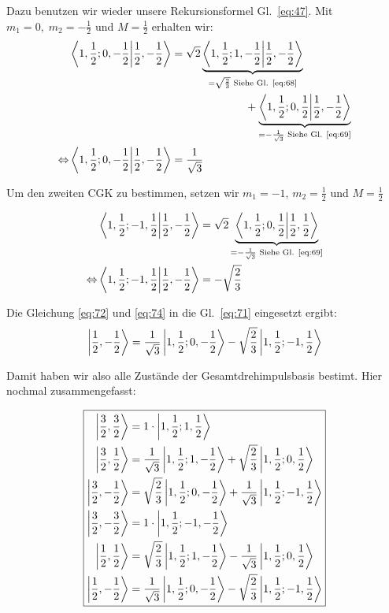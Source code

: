 Dazu benutzen wir wieder unsere Rekursionsformel Gl.~\eqref{eq:47}. Mit
\(m_1=0,\; m_2=-\frac 1 2\) und \(M=\frac 1 2\) erhalten wir:
\begin{align}
  \label{eq:72}
  &\braket{1,\frac 1 2;0,-\frac 1 2}{\frac 1 2,-\frac 1 2 }
 =\sqrt 2 \underbrace{
    \braket{1, \frac 1 2; 1, -\frac 1 2}{\frac 1 2,-\frac 1 2}}
  _{=\sqrt{\frac 2 3} \text{ Siehe Gl. \eqref{eq:68}}}\notag\\
  &\qquad\qquad\qquad\qquad\qquad\qquad\qquad\qquad+\underbrace{
    \braket{1, \frac 1 2; 0, \frac 1 2}{\frac 1 2,-\frac 1 2}}
  _{=-\frac 1 {\sqrt 3} \text{ Siehe Gl. \eqref{eq:69}}}\notag\\
 \Leftrightarrow &\braket{1, \frac 1 2; 0, -\frac 1 2}{\frac 1 2,-\frac 1 2}
 = \frac 1  {\sqrt 3} 
\end{align}

Um den zweiten CGK zu bestimmen, setzen wir \(m_1=-1\), \(m_2=\frac{1}{2}\) und \(M=\frac{1}{2}\)


\begin{align}
  \label{eq:74}
  &\braket{1,\frac 1 2;-1,\frac 1 2}{\frac 1 2,-\frac 1 2 }
 =\sqrt 2 \underbrace{
    \braket{1, \frac 1 2; 0, \frac 1 2}{\frac 1 2,\frac 1 2}}
  _{=-\frac{1}{ \sqrt{3}} \text{ Siehe Gl. \eqref{eq:69}}}\notag\\ 
 \Leftrightarrow &\braket{1, \frac 1 2; -1, \frac 1 2}{\frac 1 2,-\frac 1 2}
 = - \sqrt{ \frac 2  3 } 
\end{align}




Die Gleichung \eqref{eq:72} und \eqref{eq:74}  in die Gl.~\eqref{eq:71} eingesetzt ergibt:
\begin{equation}
  \label{eq:73}
   \left| \frac 1 2,-\frac 1 2 \right\rangle=\frac 1  {\sqrt 3} \left| 1,\frac 1 2;0,-\frac 1 2 \right\rangle - \sqrt{ \frac 2  3 } \left| 1,\frac 1 2;-1,\frac 1 2 \right\rangle  
\end{equation}

Damit haben wir also alle Zustände der Gesamtdrehimpulsbasis bestimt. Hier
nochmal zusammengefasst:


\[\boxed{
\begin{aligned}
  \left| \frac 3 2,\frac 3 2 \right\rangle&=1\cdot\left| 1,\frac 1 2;1,\frac 1 2 \right\rangle\\
  \left| \frac 3 2, \frac 1 2 \right\rangle&= 
     \frac 1 {\sqrt 3}
     \left| 1, \frac 1 2; 1, -\frac 1 2 \right\rangle
     +\sqrt {\frac 2 3} 
     \left| 1, \frac 1 2; 0, \frac 1 2 \right\rangle\\
  \left| \frac 3 2, -\frac 1 2 \right\rangle&=
     \sqrt{\frac 2 3}
     \left| 1, \frac 1 2; 0, -\frac 1 2 \right\rangle
     +\frac 1 {\sqrt 3}
     \left| 1, \frac 1 2; -1, \frac 1 2 \right\rangle\\
  \left| \frac 3 2, -\frac 3 2 \right\rangle&= 1\cdot\left| 1,\frac 1 2;-1,-\frac 1 2 \right\rangle\\
  \left| \frac 1 2, \frac 1 2 \right\rangle&=\sqrt{\frac 2 3}\left| 1,\frac 1 2;1,-\frac 1 2 \right\rangle
   -\frac 1 {\sqrt 3}\left| 1,\frac 1 2;0,\frac 1 2 \right\rangle\\
  \left| \frac 1 2,-\frac 1 2 \right\rangle&=\frac 1  {\sqrt 3} \left| 1,\frac 1 2;0,-\frac 1 2 \right\rangle - \sqrt{ \frac 2  3 } \left| 1,\frac 1 2;-1,\frac 1 2 \right\rangle 
\end{aligned}}\]





